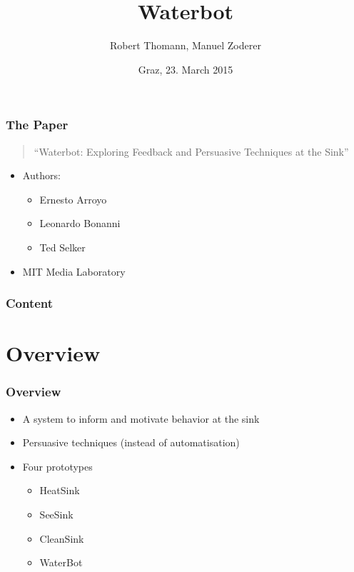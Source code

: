 \documentclass{beamer}
\title[Waterbot]{Waterbot}%
\author{Robert Thomann, Manuel Zoderer}
\date{Graz, 23. March 2015}		%
\begin{document}
\titleframe

\begin{frame}
  \frametitle{The Paper}
  \begin{quote}``Waterbot: Exploring Feedback and Persuasive Techniques at the Sink''\end{quote}
  \begin{itemize}
  \item Authors: 
    \begin{itemize} 
    \item Ernesto Arroyo
    \item Leonardo Bonanni
    \item Ted Selker
    \end{itemize}
  \item MIT Media Laboratory
  \end{itemize}
\end{frame}


\begin{frame}
  \frametitle{Content}
  \tableofcontents%
\end{frame}


\section{Overview}

\begin{frame}
	\frametitle{Overview}
	\begin{itemize}
	  \item A system to inform and motivate behavior at the sink
          \item Persuasive techniques (instead of automatisation)
          \item Four prototypes
	    \begin{itemize}
              \item HeatSink
              \item SeeSink
              \item CleanSink
              \item WaterBot
            \end{itemize}          
        \end{itemize}          

\end{frame}
\end{document}
